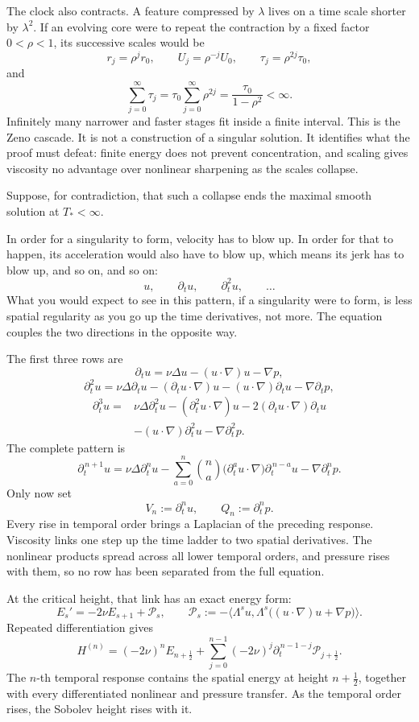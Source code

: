 \documentclass[11pt]{article}
\begin{document}
The clock also contracts. A feature compressed by \(\lambda\) lives on a time scale shorter by \(\lambda^2\). If an evolving core were to repeat the contraction by a fixed factor \(0<\rho<1\), its successive scales would be
\[
r_j=\rho^jr_0,
\qquad
U_j=\rho^{-j}U_0,
\qquad
\tau_j=\rho^{2j}\tau_0,
\]
and
\[
\sum_{j=0}^{\infty}\tau_j
=\tau_0\sum_{j=0}^{\infty}\rho^{2j}
=\frac{\tau_0}{1-\rho^2}<\infty.
\]
Infinitely many narrower and faster stages fit inside a finite interval. This is the Zeno cascade. It is not a construction of a singular solution. It identifies what the proof must defeat: finite energy does not prevent concentration, and scaling gives viscosity no advantage over nonlinear sharpening as the scales collapse.

Suppose, for contradiction, that such a collapse ends the maximal smooth solution at \(T_*<\infty\).

In order for a singularity to form, velocity has to blow up. In order for that to happen, its acceleration would also have to blow up, which means its jerk has to blow up, and so on, and so on:
\[
u,\qquad \partial_tu,\qquad \partial_t^2u,\qquad \ldots
\]
What you would expect to see in this pattern, if a singularity were to form, is less spatial regularity as you go up the time derivatives, not more. The equation couples the two directions in the opposite way.

The first three rows are
\[
\partial_tu
=\nu\Delta u-(u\cdot\nabla)u-\nabla p,
\]
\[
\partial_t^2u
=\nu\Delta\partial_tu
-(\partial_tu\cdot\nabla)u
-(u\cdot\nabla)\partial_tu
-\nabla\partial_tp,
\]
\[
\begin{aligned}
\partial_t^3u={}&\nu\Delta\partial_t^2u
-(\partial_t^2u\cdot\nabla)u
-2(\partial_tu\cdot\nabla)\partial_tu \\
&-(u\cdot\nabla)\partial_t^2u
-\nabla\partial_t^2p.
\end{aligned}
\]
The complete pattern is
\[
\partial_t^{\,n+1}u
=\nu\Delta\partial_t^nu
-\sum_{a=0}^{n}\binom na
\bigl(\partial_t^au\cdot\nabla\bigr)\partial_t^{\,n-a}u
-\nabla\partial_t^np.
\]
Only now set
\[
V_n:=\partial_t^nu,
\qquad
Q_n:=\partial_t^np.
\]
Every rise in temporal order brings a Laplacian of the preceding response. Viscosity links one step up the time ladder to two spatial derivatives. The nonlinear products spread across all lower temporal orders, and pressure rises with them, so no row has been separated from the full equation.

At the critical height, that link has an exact energy form:
\[
E_s'=-2\nu E_{s+1}+\mathcal P_s,
\qquad
\mathcal P_s
:=-\bigl\langle\Lambda^su,
\Lambda^s\bigl((u\cdot\nabla)u+\nabla p\bigr)\bigr\rangle.
\]
Repeated differentiation gives
\[
H^{(n)}
=(-2\nu)^nE_{n+\frac12}
+\sum_{j=0}^{n-1}(-2\nu)^j
\partial_t^{\,n-1-j}\mathcal P_{j+\frac12}.
\]
The \(n\)-th temporal response contains the spatial energy at height \(n+\tfrac12\), together with every differentiated nonlinear and pressure transfer. As the temporal order rises, the Sobolev height rises with it.
\end{document}
